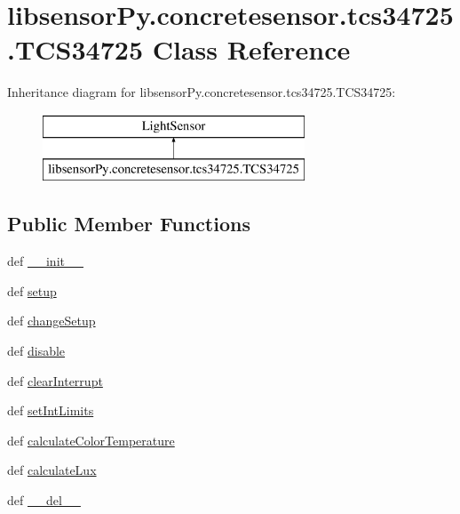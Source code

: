 \hypertarget{classlibsensorPy_1_1concretesensor_1_1tcs34725_1_1TCS34725}{}\section{libsensor\+Py.\+concretesensor.\+tcs34725.\+T\+C\+S34725 Class Reference}
\label{classlibsensorPy_1_1concretesensor_1_1tcs34725_1_1TCS34725}
Inheritance diagram for libsensor\+Py.\+concretesensor.\+tcs34725.\+T\+C\+S34725\+:\begin{figure}[H]
\begin{center}
\leavevmode
\includegraphics[height=2.000000cm]{classlibsensorPy_1_1concretesensor_1_1tcs34725_1_1TCS34725}
\end{center}
\end{figure}
\subsection*{Public Member Functions}
\begin{DoxyCompactItemize}
\item 
def \hyperlink{classlibsensorPy_1_1concretesensor_1_1tcs34725_1_1TCS34725_a28e4a65404940502ca253b1c2681f54c}{\+\_\+\+\_\+init\+\_\+\+\_\+}
\item 
def \hyperlink{classlibsensorPy_1_1concretesensor_1_1tcs34725_1_1TCS34725_aadb131353f3ef64a5381e27db05da546}{setup}
\item 
def \hyperlink{classlibsensorPy_1_1concretesensor_1_1tcs34725_1_1TCS34725_a6bde1e558ee2f621915ea88cd5f46cbe}{change\+Setup}
\item 
def \hyperlink{classlibsensorPy_1_1concretesensor_1_1tcs34725_1_1TCS34725_a2c9380fcdbf15c2b41686a41c84cc2d5}{disable}
\item 
def \hyperlink{classlibsensorPy_1_1concretesensor_1_1tcs34725_1_1TCS34725_ab0764efcab4e8afe45b7aca4b4b8dac7}{clear\+Interrupt}
\item 
def \hyperlink{classlibsensorPy_1_1concretesensor_1_1tcs34725_1_1TCS34725_a2b0c93e3bc74d159cfc31553fa5aed3d}{set\+Int\+Limits}
\item 
def \hyperlink{classlibsensorPy_1_1concretesensor_1_1tcs34725_1_1TCS34725_a05bdc4ee76e795f8db080de8544430c6}{calculate\+Color\+Temperature}
\item 
def \hyperlink{classlibsensorPy_1_1concretesensor_1_1tcs34725_1_1TCS34725_af9e31fd004981e9ecddf3f53bd7034aa}{calculate\+Lux}
\item 
def \hyperlink{classlibsensorPy_1_1concretesensor_1_1tcs34725_1_1TCS34725_ae60d8dc80c55b4301142fc7235109501}{\+\_\+\+\_\+del\+\_\+\+\_\+}
\end{DoxyCompactItemize}

